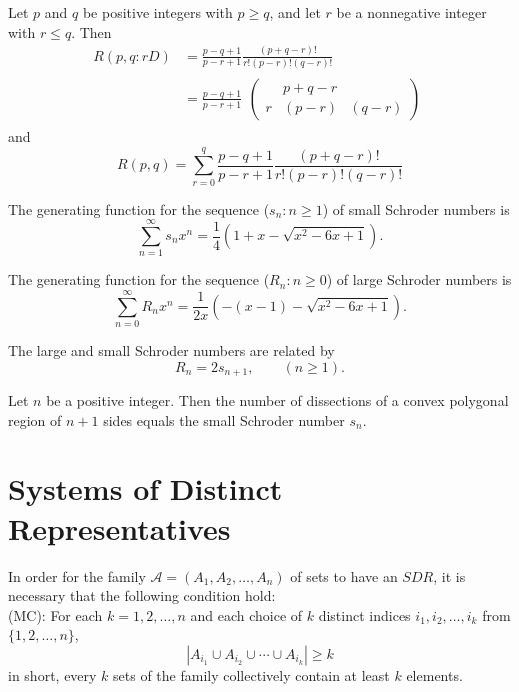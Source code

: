 \begin{theorem}
  \label{thm:8.5.5}
  Let $p$ and $q$ be positive integers with $p \geq q$, and let $r$ be a nonnegative integer with 
  $r \leq q$. Then
  \begin{align*}
    R(p, q : rD) &= \frac{p-q+1}{p-r+1}\frac{(p+q-r)!}{r!(p-r)!(q-r)!} \\
    &= \frac{p-q+1}{p-r+1}\begin{eqnarray}
      \begin{pmatrix}
         & p+q-r & \\
        r & (p-r) & (q-r)
      \end{pmatrix}
    \end{eqnarray}
  \end{align*}
  and
  \[R(p, q)=\sum\limits_{r=0}^q \frac{p-q+1}{p-r+1} \frac{(p+q-r)!}{r!(p-r)!(q-r)!}\]
\end{theorem}

\begin{theorem}
  \label{thm:8.5.6}
  The generating function for the sequence ($s_n: n \geq 1$) of small Schroder numbers is
  \[\sum\limits_{n=1}^{\infty} s_n x^n=\frac{1}{4}\left(1+x-\sqrt{x^2-6 x+1}\right). \]
\end{theorem}

\begin{theorem}
  \label{thm:8.5.7}
  The generating function for the sequence ($R_n: n \geq 0$) of large Schroder numbers is
  \[\sum\limits_{n=0}^{\infty} R_n x^n=\frac{1}{2x}\left(-(x - 1)-\sqrt{x^2-6 x+1}\right). \]
\end{theorem}

\begin{corollary}
  \label{cor:8.5.8}
  The large and small Schroder numbers are related by
  \[ R_n = 2s_{n+1}, \qquad (n \geq 1). \]
\end{corollary}

\begin{theorem}
  \label{thm:8.5.9}
  Let $n$ be a positive integer. Then the number of dissections of a convex polygonal region of 
  $n + 1$ sides equals the small Schroder number $s_n$.
\end{theorem}

\chapter{Systems of Distinct Representatives}

\begin{theorem}
  \label{thm:9.2.1}
  In order for the family $\mathcal{A} = (A_1, A_2 ,\ldots , A_n)$ of sets to have an $SDR$, it is 
  necessary that the following condition hold:\\
  (MC): For each $k=1,2, \ldots, n$ and each choice of $k$ distinct indices $i_1, i_2, \ldots, i_k$ 
  from $\{1,2, \ldots, n\}$,
  \begin{equation}\label{9.1}
    \left|A_{i_1} \cup A_{i_2} \cup \cdots \cup A_{i_k}\right| \geq k  
  \end{equation}
  in short, every $k$ sets of the family collectively contain at least $k$ elements.
\end{theorem}

